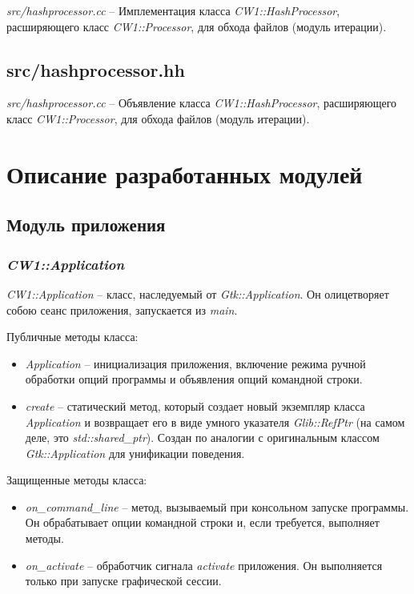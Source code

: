\textit{src/hashprocessor.cc} -- Имплементация класса
\textit{CW1::HashProcessor}, расширяющего класс \textit{CW1::Processor}, для
обхода файлов (модуль итерации).

\subsection{src/hashprocessor.hh}

\textit{src/hashprocessor.cc} -- Объявление класса \textit{CW1::HashProcessor},
расширяющего класс \textit{CW1::Processor}, для обхода файлов (модуль итерации).

\section{Описание разработанных модулей}

\subsection*{Модуль приложения}

\subsubsection{\textit{CW1::Application}}

\textit{CW1::Application} -- класс, наследуемый от \textit{Gtk::Application}. Он
олицетворяет собою сеанс приложения, запускается из \textit{main}.

Публичные методы класса:

\begin{itemize}
    \item \textit{Application} -- инициализация приложения, включение режима
          ручной обработки опций программы и объявления опций командной строки.
    \item \textit{create} -- статический метод, который создает новый экземпляр
          класса \textit{Application} и возвращает его в виде умного указателя
          \textit{Glib::RefPtr} (на самом деле, это \textit{std::shared\_ptr}).
          Создан по аналогии с оригинальным классом \textit{Gtk::Application}
          для унификации поведения.
\end{itemize}

Защищенные методы класса:

\begin{itemize}
    \item \textit{on\_command\_line} -- метод, вызываемый при консольном запуске
          программы. Он обрабатывает опции командной строки и, если требуется,
          выполняет методы.
    \item \textit{on\_activate} -- обработчик сигнала \textit{activate}
          приложения. Он выполняется только при запуске графической сессии.
\end{itemize}

